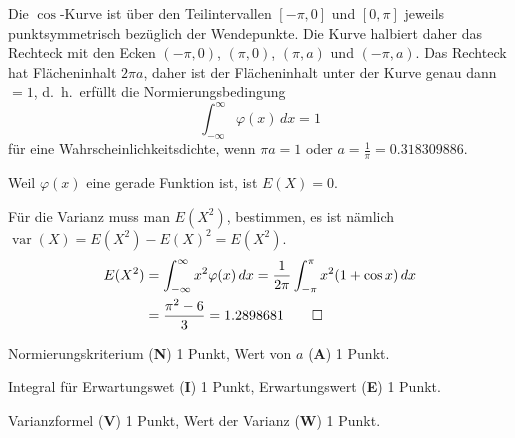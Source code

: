 \begin{loesung}
\begin{teilaufgaben}
\item
Die $\cos$-Kurve ist über den Teilintervallen $[-\pi,0]$ und $[0,\pi]$
jeweils punktsymmetrisch bezüglich der Wendepunkte.
Die Kurve halbiert daher das Rechteck mit den Ecken $(-\pi,0)$, $(\pi,0)$,
$(\pi,a)$ und $(-\pi,a)$.
Das Rechteck hat Flächeninhalt $2\pi a$, daher ist der Flächeninhalt unter
der Kurve genau dann $=1$, d.~h.~erfüllt die Normierungsbedingung 
\[
\int_{-\infty}^\infty \varphi(x)\,dx = 1
\]
für eine Wahrscheinlichkeitsdichte, wenn $\pi a=1$ oder
$a=\frac1{\pi}=0.318309886$.
\item
Weil $\varphi(x)$ eine gerade Funktion ist, ist $E(X)=0$.
\item 
Für die Varianz muss man $E(X^2)$, bestimmen, es ist nämlich
$\operatorname{var}(X)=E(X^2)-E(X)^2 = E(X^2)$.
\begin{align*}
E(X^2)
&=
\int_{-\infty}^\infty x^2 \varphi(x)\,dx
=
\frac1{2\pi}
\int_{-\pi}^{\pi}
x^2 (1+\cos x)\,dx
\\
&=\frac{\pi^2-6}{3}
=
1.2898681
\qedhere
\end{align*}
\end{teilaufgaben}
\end{loesung}

\begin{bewertung}
\begin{teilaufgaben}
\item Normierungskriterium ({\bf N}) 1 Punkt, Wert von $a$ ({\bf A}) 1 Punkt.
\item Integral für Erwartungswet ({\bf I}) 1 Punkt,
Erwartungswert ({\bf E}) 1 Punkt.
\item Varianzformel ({\bf V}) 1 Punkt,
Wert der Varianz ({\bf W}) 1 Punkt.
\end{teilaufgaben}
\end{bewertung}
